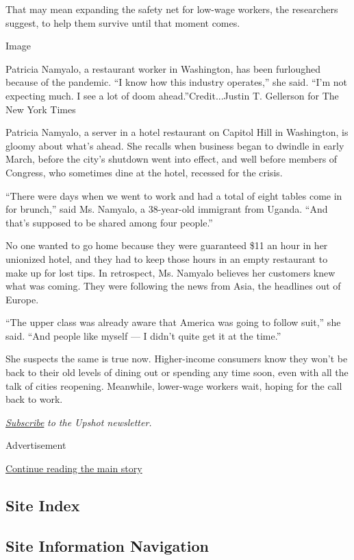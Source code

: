 That may mean expanding the safety net for low-wage workers, the
researchers suggest, to help them survive until that moment comes.

Image

Patricia Namyalo, a restaurant worker in Washington, has been furloughed
because of the pandemic. ``I know how this industry operates,'' she
said. ``I'm not expecting much. I see a lot of doom
ahead.''Credit...Justin T. Gellerson for The New York Times

Patricia Namyalo, a server in a hotel restaurant on Capitol Hill in
Washington, is gloomy about what's ahead. She recalls when business
began to dwindle in early March, before the city's shutdown went into
effect, and well before members of Congress, who sometimes dine at the
hotel, recessed for the crisis.

``There were days when we went to work and had a total of eight tables
come in for brunch,'' said Ms. Namyalo, a 38-year-old immigrant from
Uganda. ``And that's supposed to be shared among four people.''

No one wanted to go home because they were guaranteed \$11 an hour in
her unionized hotel, and they had to keep those hours in an empty
restaurant to make up for lost tips. In retrospect, Ms. Namyalo believes
her customers knew what was coming. They were following the news from
Asia, the headlines out of Europe.

``The upper class was already aware that America was going to follow
suit,'' she said. ``And people like myself --- I didn't quite get it at
the time.''

She suspects the same is true now. Higher-income consumers know they
won't be back to their old levels of dining out or spending any time
soon, even with all the talk of cities reopening. Meanwhile, lower-wage
workers wait, hoping for the call back to work.

\href{https://www.nytimes3xbfgragh.onion/newsletters/upshot}{\emph{Subscribe}}
\emph{to the Upshot newsletter.}

Advertisement

\protect\hyperlink{after-bottom}{Continue reading the main story}

\hypertarget{site-index}{%
\subsection{Site Index}\label{site-index}}

\hypertarget{site-information-navigation}{%
\subsection{Site Information
Navigation}\label{site-information-navigation}}

